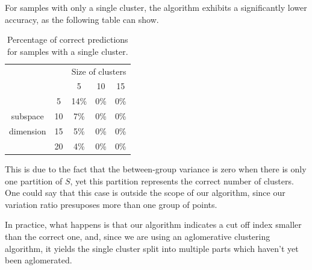 \documentclass[12pt]{article}
\begin{document}
For samples with only a single cluster, the algorithm exhibits a significantly lower accuracy, as the following table can show.

\begin{table}[H]
\begin{center}
	\begin{tabular}{cc|c|c|c|}
		\cline{3-5}
		& & \multicolumn{3}{c|}{Size of clusters} \\ 
		\cline{3-5}
		& & 5 & 10 & 15 \\
		\hline
		\multicolumn{1}{|c}{} & 
		\multicolumn{1}{|c|}{5} & 14\% & 0\%& 0\%	 	\\ \cline{2-5}
		\multicolumn{1}{|c}{ subspace} & 
		\multicolumn{1}{|c|}{10} & 7\% & 0\%& 0\% 	\\ \cline{2-5}
		\multicolumn{1}{|c}{ dimension} & 
		\multicolumn{1}{|c|}{15} & 5\% & 0\%& 0\% 	\\ \cline{2-5}
		\multicolumn{1}{|c}{} & 
		\multicolumn{1}{|c|}{20} & 4\% & 0\%& 0\% 	\\ \cline{1-5}
	\end{tabular}
	\caption{Percentage of correct predictions for samples with a single cluster.}
\end{center}
\end{table}
This is due to the fact that the between-group variance is zero when there is only one partition of $S$, yet this partition represents the correct number of clusters. One could say that this case is outside the scope of our algorithm, since our variation ratio presuposes more than one group of points. 

In practice, what happens is that our algorithm indicates a cut off index  smaller than the correct one, and, since we are using an aglomerative clustering algorithm, it yields the single cluster split into multiple parts which haven't yet been aglomerated.  

\end{document}
